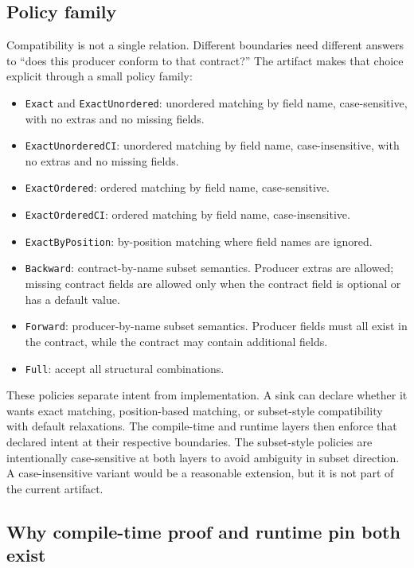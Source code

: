 \subsection{Policy family}

Compatibility is not a single relation. Different boundaries need different answers to ``does this producer conform to that contract?'' The artifact makes that choice explicit through a small policy family:

\begin{itemize}[leftmargin=1.5em]
  \item \texttt{Exact} and \texttt{ExactUnordered}: unordered matching by field name, case-sensitive, with no extras and no missing fields.
  \item \texttt{ExactUnorderedCI}: unordered matching by field name, case-insensitive, with no extras and no missing fields.
  \item \texttt{ExactOrdered}: ordered matching by field name, case-sensitive.
  \item \texttt{ExactOrderedCI}: ordered matching by field name, case-insensitive.
  \item \texttt{ExactByPosition}: by-position matching where field names are ignored.
  \item \texttt{Backward}: contract-by-name subset semantics. Producer extras are allowed; missing contract fields are allowed only when the contract field is optional or has a default value.
  \item \texttt{Forward}: producer-by-name subset semantics. Producer fields must all exist in the contract, while the contract may contain additional fields.
  \item \texttt{Full}: accept all structural combinations.
\end{itemize}

These policies separate intent from implementation. A sink can declare whether it wants exact matching, position-based matching, or subset-style compatibility with default relaxations. The compile-time and runtime layers then enforce that declared intent at their respective boundaries.
The subset-style policies are intentionally case-sensitive at both layers to avoid ambiguity in subset direction. A case-insensitive variant would be a reasonable extension, but it is not part of the current artifact.

\subsection{Why compile-time proof and runtime pin both exist}
\label{sec:predicate-family}

